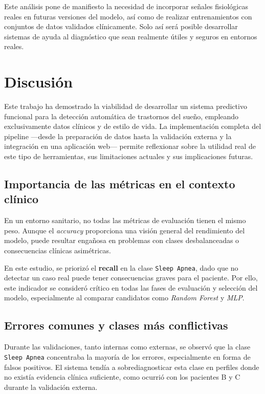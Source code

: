 Este análisis pone de manifiesto la necesidad de incorporar señales fisiológicas reales en futuras versiones del modelo, así como de realizar entrenamientos con conjuntos de datos validados clínicamente. Solo así será posible desarrollar sistemas de ayuda al diagnóstico que sean realmente útiles y seguros en entornos reales.

\section{Discusión}

Este trabajo ha demostrado la viabilidad de desarrollar un sistema predictivo funcional para la detección automática de trastornos del sueño, empleando exclusivamente datos clínicos y de estilo de vida. La implementación completa del pipeline —desde la preparación de datos hasta la validación externa y la integración en una aplicación web— permite reflexionar sobre la utilidad real de este tipo de herramientas, sus limitaciones actuales y sus implicaciones futuras.


\subsection{Importancia de las métricas en el contexto clínico}

En un entorno sanitario, no todas las métricas de evaluación tienen el mismo peso. Aunque el \textit{accuracy} proporciona una visión general del rendimiento del modelo, puede resultar engañosa en problemas con clases desbalanceadas o consecuencias clínicas asimétricas.

En este estudio, se priorizó el \textbf{recall} en la clase \texttt{Sleep Apnea}, dado que no detectar un caso real puede tener consecuencias graves para el paciente. Por ello, este indicador se consideró crítico en todas las fases de evaluación y selección del modelo, especialmente al comparar candidatos como \textit{Random Forest} y \textit{MLP}.


\subsection{Errores comunes y clases más conflictivas}

Durante las validaciones, tanto internas como externas, se observó que la clase \texttt{Sleep Apnea} concentraba la mayoría de los errores, especialmente en forma de falsos positivos. El sistema tendía a sobrediagnosticar esta clase en perfiles donde no existía evidencia clínica suficiente, como ocurrió con los pacientes B y C durante la validación externa.

